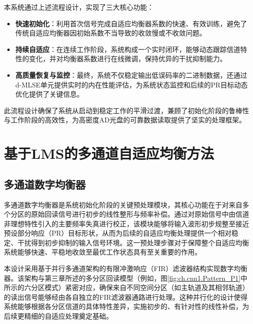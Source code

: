 本系统通过上述流程设计，实现了三大核心功能：
\begin{itemize}
	\item \textbf{快速初始化}：利用首次信号完成自适应均衡器系数的快速、有效训练，避免了传统自适应均衡器因初始系数不当导致的收敛慢或不收敛问题。
	\item \textbf{持续自适应}：在连续工作阶段，系统构成一个实时闭环，能够动态跟踪信道特性的变化，并对均衡器系数进行在线微调，保持优异的干扰抑制能力。
	\item \textbf{高质量恢复与监控}：最终，系统不仅稳定输出低误码率的二进制数据，还通过d-MLSE单元提供实时的内在性能评估，为系统状态监控和后续的PR目标动态优化提供了关键信息。
\end{itemize}

此流程设计确保了系统从启动到稳定工作的平滑过渡，兼顾了初始化阶段的鲁棒性与工作阶段的高效性，为高密度AD光盘的可靠数据读取提供了坚实的处理框架。

\section{基于LMS的多通道自适应均衡方法}

\subsection{多通道数字均衡器}

多通道数字均衡器是系统初始化阶段的关键预处理模块，其核心功能在于对来自多个分区的原始回读信号进行初步的线性整形与频率补偿。通过对原始信号中由信道非理想特性引入的主要频率失真进行校正，该模块能够将输入波形初步规整至接近预设部分响应（PR）目标形状，从而为后续的自适应均衡处理提供一个相对稳定、干扰得到初步抑制的输入信号环境。这一预处理步骤对于保障整个自适应均衡系统能够快速、平稳地收敛至最优工作状态具有至关重要的作用。

本设计采用基于并行多通道架构的有限冲激响应（FIR）滤波器结构实现数字均衡器。该架构与第三章所述的多分区回读模型（例如，图\ref{fig:ch.cnn1.Pattern_P1}中所示的六分区模式）紧密对应，确保来自不同空间分区（如主轨道及其相邻轨道）的读出信号能够经由各自独立的FIR滤波器通路进行处理。这种并行化的设计使得系统能够根据各分区信道的具体特性差异，实施初步的、有针对性的线性补偿，为后续更精细的自适应处理奠定基础。

